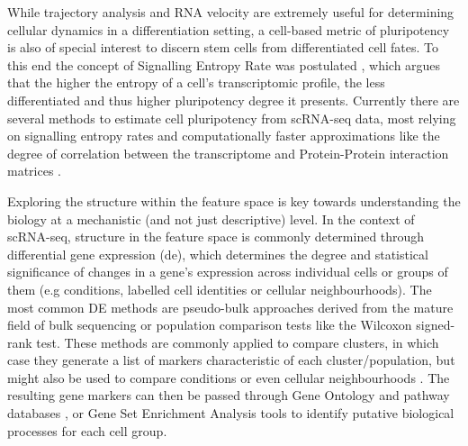 While trajectory analysis and RNA velocity are extremely useful for determining cellular dynamics in a differentiation setting, a cell-based metric of pluripotency is also of special interest to discern stem cells from differentiated cell fates. To this end the concept of Signalling Entropy Rate was postulated \cite{teschendorff_signalling_2014}, which argues that the higher the entropy of a cell's transcriptomic profile, the less differentiated and thus higher pluripotency degree it presents. Currently there are several methods to estimate cell pluripotency from scRNA-seq data, most relying on signalling entropy rates and computationally faster approximations like the degree of correlation between the transcriptome and Protein-Protein interaction matrices \cite{teschendorff_single-cell_2017,gulati_single-cell_2020,senra_origins_2022}. 

Exploring the structure within the feature space is key towards understanding the biology at a mechanistic (and not just descriptive) level. In the context of scRNA-seq, structure in the feature space is commonly determined through differential gene expression (\acrshort{de}), which determines the degree and statistical significance of changes in a gene's expression across individual cells or groups of them (e.g conditions, labelled cell identities or cellular neighbourhoods). The most common DE methods are pseudo-bulk approaches derived from the mature field of bulk sequencing \cite{robinson_edger_2010,finak_mast_2015} or population comparison tests like the Wilcoxon signed-rank test. These methods are commonly applied to compare clusters, in which case they generate a list of markers characteristic of each cluster/population, but might also be used to compare conditions or even cellular neighbourhoods \cite{missarova_sensitive_2023}. The resulting gene markers can then be passed through Gene Ontology \cite{ashburner_gene_2000} and pathway databases \cite{kanehisa_kegg_2017,turei_integrated_2021,gillespie_reactome_2022}, or Gene Set Enrichment Analysis tools \cite{subramanian_gene_2005} to identify putative biological processes for each cell group. 

